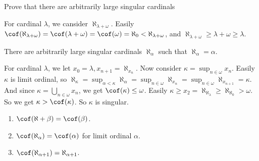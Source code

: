 \documentclass[a5paper]{ctexart}
\newif\ifpreface
\begin{document}
\large
\setlength{\baselineskip}{1.2em}
\ifpreface
    
\else
\maketitle
\fi
{}
\begin{problem}\label{pro:1}
  Prove that there are arbitrarily large singular cardinals
\end{problem}
\begin{solution}
  For cardinal \(\lambda\), we cansider \(\aleph_{\lambda+\omega}\). 
  Easily \(\cof( \aleph_{\lambda+\omega})=\cof( \lambda+\omega)=\cof( \omega)=\aleph_0<\aleph_{\lambda+\omega}\), and 
  \(\aleph_{\lambda+\omega}\geq \lambda+\omega \geq \lambda\). 
\end{solution}
\begin{problem}\label{pro:2}
  There are arbitrarily large singular cardinals \(\aleph_{\alpha}\) such that \(\aleph_{\alpha}=\alpha\). 
\end{problem}
\begin{solution}
  For cardinal \(\lambda\), we let \(x_0=\lambda,x_{n+1}=\aleph_{x_{n}}\). Now consider \(\kappa=\sup_{n \in \omega}x_n\). 
  Easily \(\kappa\) is limit ordinal, so \(\aleph_{\kappa}=\sup_{\alpha<\kappa}\aleph_{\alpha}=\sup_{n \in \omega}\aleph_{x_n}=\sup_{n \in \omega}\aleph_{x_{n+1}}=\kappa\). 
  And since \(\kappa=\bigcup_{n \in \omega}x_n\), we get \(\cof( \kappa)\leq \omega\). Easily \(\kappa \geq x_2 =\aleph_{\aleph_{\lambda}} \geq \aleph_{\aleph_0}>\omega\). 
  So we get \(\kappa>\cof( \kappa)\). So \(\kappa\) is singular.
\end{solution}
\begin{problem}\label{pro:3}
  \begin{enumerate}
    \item \(\cof( \aleph+\beta)=\cof( \beta)\).
    \item \(\cof( \aleph_{\alpha})=\cof( \alpha)\) for limit ordinal \(\alpha\). 
    \item \(\cof( \aleph_{\alpha+1})=\aleph_{\alpha+1}\).
  \end{enumerate}
\end{problem}
\end{document}
